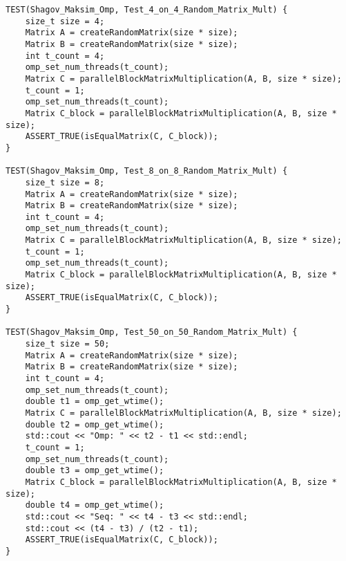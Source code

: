 \documentclass{report}
\begin{document}
\begin{lstlisting}
TEST(Shagov_Maksim_Omp, Test_4_on_4_Random_Matrix_Mult) {
    size_t size = 4;
    Matrix A = createRandomMatrix(size * size);
    Matrix B = createRandomMatrix(size * size);
    int t_count = 4;
    omp_set_num_threads(t_count);
    Matrix C = parallelBlockMatrixMultiplication(A, B, size * size);
    t_count = 1;
    omp_set_num_threads(t_count);
    Matrix C_block = parallelBlockMatrixMultiplication(A, B, size * size);
    ASSERT_TRUE(isEqualMatrix(C, C_block));
}

TEST(Shagov_Maksim_Omp, Test_8_on_8_Random_Matrix_Mult) {
    size_t size = 8;
    Matrix A = createRandomMatrix(size * size);
    Matrix B = createRandomMatrix(size * size);
    int t_count = 4;
    omp_set_num_threads(t_count);
    Matrix C = parallelBlockMatrixMultiplication(A, B, size * size);
    t_count = 1;
    omp_set_num_threads(t_count);
    Matrix C_block = parallelBlockMatrixMultiplication(A, B, size * size);
    ASSERT_TRUE(isEqualMatrix(C, C_block));
}

TEST(Shagov_Maksim_Omp, Test_50_on_50_Random_Matrix_Mult) {
    size_t size = 50;
    Matrix A = createRandomMatrix(size * size);
    Matrix B = createRandomMatrix(size * size);
    int t_count = 4;
    omp_set_num_threads(t_count);
    double t1 = omp_get_wtime();
    Matrix C = parallelBlockMatrixMultiplication(A, B, size * size);
    double t2 = omp_get_wtime();
    std::cout << "Omp: " << t2 - t1 << std::endl;
    t_count = 1;
    omp_set_num_threads(t_count);
    double t3 = omp_get_wtime();
    Matrix C_block = parallelBlockMatrixMultiplication(A, B, size * size);
    double t4 = omp_get_wtime();
    std::cout << "Seq: " << t4 - t3 << std::endl;
    std::cout << (t4 - t3) / (t2 - t1);
    ASSERT_TRUE(isEqualMatrix(C, C_block));
}
\end{lstlisting}
\end{document}
